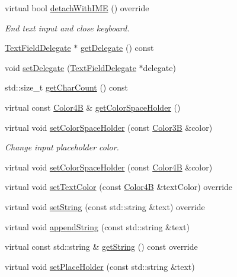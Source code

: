 \begin{DoxyCompactItemize}
virtual bool \hyperlink{classTextFieldTTF_a9d003ddd53582cd13e043feb23788f6a}{detach\+With\+I\+ME} () override
\begin{DoxyCompactList}\small\item\em End text input and close keyboard. \end{DoxyCompactList}\item 
\hyperlink{classTextFieldDelegate}{Text\+Field\+Delegate} $\ast$ \hyperlink{classTextFieldTTF_a9e70cd73fc3190132028b659f40701d1}{get\+Delegate} () const
\item 
void \hyperlink{classTextFieldTTF_a536d7e986a4623672a6a1506dc5b6684}{set\+Delegate} (\hyperlink{classTextFieldDelegate}{Text\+Field\+Delegate} $\ast$delegate)
\item 
std\+::size\+\_\+t \hyperlink{classTextFieldTTF_ac058c16dce279485b28c944583f924df}{get\+Char\+Count} () const
\item 
virtual const \hyperlink{structColor4B}{Color4B} \& \hyperlink{classTextFieldTTF_afb471876e4d7949e6dbd39d33cd0076f}{get\+Color\+Space\+Holder} ()
\item 
virtual void \hyperlink{classTextFieldTTF_a64ca9201c9b9c2a09200341c5db244f0}{set\+Color\+Space\+Holder} (const \hyperlink{structColor3B}{Color3B} \&color)
\begin{DoxyCompactList}\small\item\em Change input placeholder color. \end{DoxyCompactList}\item 
virtual void \hyperlink{classTextFieldTTF_a0669ba28e14284524a2027fcd7fed71e}{set\+Color\+Space\+Holder} (const \hyperlink{structColor4B}{Color4B} \&color)
\item 
virtual void \hyperlink{classTextFieldTTF_a3ddb9d26ec68e2b25bcdda2a1628f267}{set\+Text\+Color} (const \hyperlink{structColor4B}{Color4B} \&text\+Color) override
\item 
virtual void \hyperlink{classTextFieldTTF_a0aee071a7df021d656ace9455e2c0b91}{set\+String} (const std\+::string \&text) override
\item 
virtual void \hyperlink{classTextFieldTTF_ad179081ee78e5669c65e7a82a42dae94}{append\+String} (const std\+::string \&text)
\item 
virtual const std\+::string \& \hyperlink{classTextFieldTTF_a078bee267d229540d0940ef7f1413240}{get\+String} () const override
\item 
virtual void \hyperlink{classTextFieldTTF_a7bba66ec520bca4f92dd877c8012037c}{set\+Place\+Holder} (const std\+::string \&text)
\item 

\end{DoxyCompactItemize}
